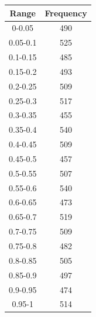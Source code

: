 \documentclass{article}
\begin{document}
\begin{table}
{ \begin{tabular}{||c | c||}  \hline
		Range & Frequency \\ [0.5ex] \hline \hline0-0.05 & 490\\
		\hline 
		0.05-0.1 & 525\\
		\hline 
		0.1-0.15 & 485\\
		\hline 
		0.15-0.2 & 493\\
		\hline 
		0.2-0.25 & 509\\
		\hline 
		0.25-0.3 & 517\\
		\hline 
		0.3-0.35 & 455\\
		\hline 
		0.35-0.4 & 540\\
		\hline 
		0.4-0.45 & 509\\
		\hline 
		0.45-0.5 & 457\\
		\hline 
		0.5-0.55 & 507\\
		\hline 
		0.55-0.6 & 540\\
		\hline 
		0.6-0.65 & 473\\
		\hline 
		0.65-0.7 & 519\\
		\hline 
		0.7-0.75 & 509\\
		\hline 
		0.75-0.8 & 482\\
		\hline 
		0.8-0.85 & 505\\
		\hline 
		0.85-0.9 & 497\\
		\hline 
		0.9-0.95 & 474\\
		\hline 
		0.95-1 & 514\\
		\hline 
	\end{tabular} 

}
\parbox{.3\linewidth}{

}
\end{table}
\end{document}
